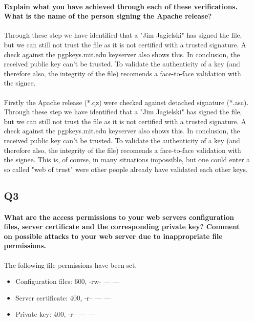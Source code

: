 \documentclass[a4paper,11pt]{article}
\begin{document}
\paragraph{Explain what you have achieved through each of these veriﬁcations. What is the name of the person signing the Apache release?}
\paragraph{}Through these step we have identified that a "Jim Jagielski" has signed the file, but we can still not trust the file as it is not certified with a trusted signature. A check against the pgpkeys.mit.edu keyserver also shows this. In conclusion, the received public key can't be trusted. To validate the authenticity of a key (and therefore also, the integrity of the file) \cite{4} recomends a face-to-face validation with the signee. 
\paragraph{}Firstly the Apache release (*.qz) were checked against detached signature (*.asc). Through these step we have identified that a "Jim Jagielski" has signed the file, but we can still not trust the file as it is not certified with a trusted signature. A check against the pgpkeys.mit.edu keyserver also shows this. In conclusion, the received public key can't be trusted. To validate the authenticity of a key (and therefore also, the integrity of the file) \cite{4} recomends a face-to-face validation with the signee. This is, of course, in many situations impossible, but one could enter a so called "web of trust" were other people already have validated each other keys.  
\subsection{Q3}
\paragraph{What are the access permissions to your web servers conﬁguration files, server certiﬁcate and the corresponding private key? Comment on possible attacks to your web server due to inappropriate file permissions.}
\paragraph{}The following file permissions have been set.
\begin{itemize}
	\item Configuration files: 600, -rw- --- ---
	\item Server certificate: 400, -r-- --- ---
	\item Private key: 400, -r-- --- ---
\end{itemize}
\end{document}
